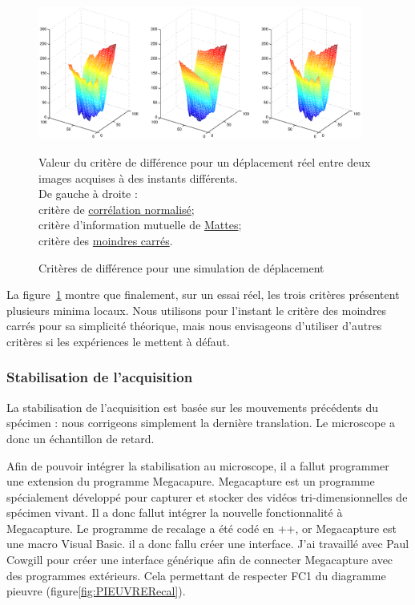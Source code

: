 \begin{figure}[h]
\begin{center}
\leavevmode
\includegraphics[width=0.95\textwidth]{pictures/Recal3DmetricsCMSReal}
\end{center}
\caption{Critères de différence pour une simulation de déplacement}{Valeur du critère de différence pour un déplacement réel entre deux images acquises à des instants différents.\\
De gauche à droite :\\
critère de \href{http://www.itk.org/Doxygen/html/classitk_1_1NormalizedCorrelationImageToImageMetric.html}{corrélation normalisé};\\
critère d'information mutuelle de \href{http://www.itk.org/Doxygen/html/classitk_1_1MattesMutualInformationImageToImageMetric.html}{Mattes};\\
critère des \href{http://www.itk.org/Doxygen/html/classitk_1_1MeanSquaresImageToImageMetric.html}{moindres carrés}. }
\label{fig:RecalMetricReal}
\end{figure}


La figure~\ref{fig:RecalMetricReal} montre que finalement, sur un essai réel, les trois critères présentent plusieurs minima locaux.
Nous utilisons pour l'instant le critère des moindres carrés pour sa simplicité théorique, mais nous envisageons d'utiliser d'autres critères si les expériences le mettent à défaut.


\subsubsection{Stabilisation de l'acquisition}

La stabilisation de l'acquisition est basée sur les mouvements précédents du spécimen :
nous corrigeons simplement la dernière translation. Le microscope a donc un échantillon de retard.

Afin de pouvoir intégrer la stabilisation au microscope, il a fallut programmer une extension du programme Megacapure.
Megacapture est un programme spécialement développé pour capturer et stocker
des vidéos tri-dimensionnelles de spécimen vivant.
Il a donc fallut intégrer la nouvelle fonctionnalité à Megacapture. Le programme de recalage a été codé en {\C++},
or Megacapture est une macro Visual Basic. il a donc fallu créer une interface.
J'ai travaillé avec Paul Cowgill pour créer une interface générique afin de connecter
Megacapture avec des programmes extérieurs. Cela permettant de respecter FC1 du diagramme pieuvre
(figure\ref{fig:PIEUVRERecal}).

